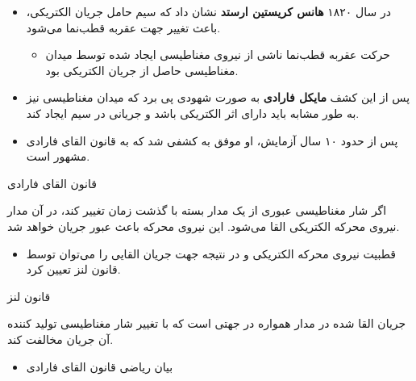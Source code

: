 \ELhold


\begin{ELunit}

\begin{itemize}
\tightlist
\item
  در سال ۱۸۲۰ \textbf{هانس کریستین ارستد} نشان داد که سیم حامل جریان الکتریکی، باعث تغییر جهت عقربه قطب‌نما می‌شود.

  \begin{itemize}
  \tightlist
  \item
    حرکت عقربه قطب‌نما ناشی از نیروی مغناطیسی ایجاد شده توسط میدان مغناطیسی حاصل از جریان الکتریکی بود.
  \end{itemize}
\item
  پس از این کشف \textbf{مایکل فارادی} به صورت شهودی پی برد که میدان مغناطیسی نیز به طور مشابه باید دارای اثر الکتریکی باشد و جریانی در سیم ایجاد کند.
\item
  پس از حدود ۱۰ سال آزمایش، او موفق به کشفی شد که به قانون القای فارادی مشهور است.
\end{itemize}

\end{ELunit}

\begin{ELdefinition}{قانون القای فارادی}

اگر شار مغناطیسی عبوری از یک مدار بسته با گذشت زمان تغییر کند، در آن مدار نیروی محرکه الکتریکی القا می‌شود. این نیروی محرکه باعث عبور جریان خواهد شد.

\end{ELdefinition}

\begin{ELjoin}

\begin{itemize}
\tightlist
\item
  قطبیت نیروی محرکه الکتریکی و در نتیجه جهت جریان القایی را می‌توان توسط قانون لنز تعیین کرد.
\end{itemize}

\begin{ELdefinition}{قانون لنز}

جریان القا شده در مدار همواره در جهتی است که با تغییر شار مغناطیسی تولید کننده آن جریان مخالفت کند.

\end{ELdefinition}

\end{ELjoin}

\begin{ELjoin}

\begin{itemize}
\tightlist
\item
  بیان ریاضی قانون القای فارادی
\end{itemize}

\begin{ELimportant}{}


\end{ELimportant}

\end{ELjoin}

